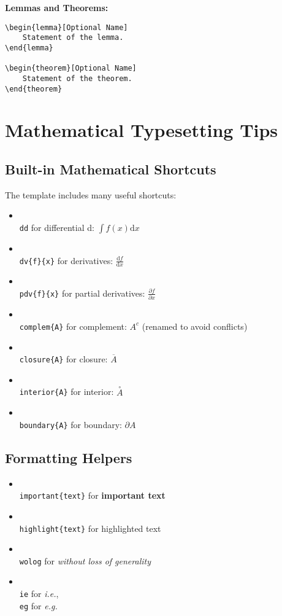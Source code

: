 \documentclass[11pt, oneside, openany]{book}
\theoremstyle{definition}
\newtheorem{lemma}{Lemma}[section]
\newtheorem{theorem}{Theorem}[section]
\newcommand{\closure}[1]{\overline{#1}}              %
\newcommand{\interior}[1]{\overset{\circ}{#1}}       %
\newcommand{\boundary}[1]{\partial #1}               %
\newcommand{\complem}[1]{#1^c}                      %
\newcommand{\dd}{\mathrm{d}}                          %
\newcommand{\dv}[2]{\frac{\dd #1}{\dd #2}}          %
\newcommand{\pdv}[2]{\frac{\partial #1}{\partial #2}} %
\newcommand{\important}[1]{\textbf{\color{primaryblue}#1}}
\newcommand{\highlight}[1]{\colorbox{lightblue!50}{#1}}
\newcommand{\wolog}{\emph{without loss of generality}}  %
\newcommand{\ie}{\emph{i.e.}}
\newcommand{\eg}{\emph{e.g.}}
\begin{document}
\textbf{Lemmas and Theorems:}
\begin{verbatim}
\begin{lemma}[Optional Name]
    Statement of the lemma.
\end{lemma}

\begin{theorem}[Optional Name]
    Statement of the theorem.
\end{theorem}
\end{verbatim}

\section*{Mathematical Typesetting Tips}

\subsection*{Built-in Mathematical Shortcuts}

The template includes many useful shortcuts:

\begin{itemize}
    \item \texttt{\\dd} for differential d: $\int f(x) \dd x$
    \item \texttt{\\dv\{f\}\{x\}} for derivatives: $\dv{f}{x}$
    \item \texttt{\\pdv\{f\}\{x\}} for partial derivatives: $\pdv{f}{x}$
    \item \texttt{\\complem\{A\}} for complement: $\complem{A}$ (renamed to avoid conflicts)
    \item \texttt{\\closure\{A\}} for closure: $\closure{A}$
    \item \texttt{\\interior\{A\}} for interior: $\interior{A}$
    \item \texttt{\\boundary\{A\}} for boundary: $\boundary{A}$
\end{itemize}

\subsection*{Formatting Helpers}

\begin{itemize}
    \item \texttt{\\important\{text\}} for \important{important text}
    \item \texttt{\\highlight\{text\}} for \highlight{highlighted text}
    \item \texttt{\\wolog} for \wolog
    \item \texttt{\\ie} for \ie, \texttt{\\eg} for \eg
\end{itemize}
\end{document}
